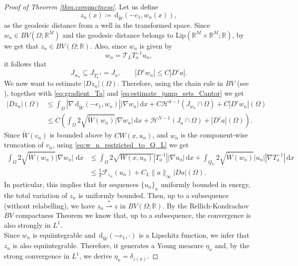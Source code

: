 \documentclass[a4paper, 11pt, reqno]{amsart}
\theoremstyle{plain}
\theoremstyle{definition}
\theoremstyle{remark}
\newcommand{\R}{\mathbb R}
\newcommand{\eps}{\varepsilon}
\renewcommand{\H}{\mathcal H}
\newcommand{\dd}{\,\mathrm{d}}
\begin{document}
\begin{proof}[Proof of Theorem \ref{thm:compactness}]
    Let us define 
    $$ z_n(x) \coloneqq \dd_{\tilde W}(-e_1, w_n(x)), $$
    as the geodesic distance from a well in the transformed space.
    Since $w_n \in BV(\Omega; \R^M)$ and the geodesic distance belongs to $\mathrm{Lip}(\R^M \times \R^M; \R)$, by \cite[Proposition 3.69(c)]{AFP} we get that $z_n \in BV(\Omega; \R)$.
    Also, since $w_n$ is given by
    $$ w_n = \mathcal{T}_L T_a^{-1} u_n, $$
    it follows that 
    \begin{equation}\label{eq:estimate_jump_sets_Cantor}
        J_{w_n} \subseteq J_{T_a^{-1}} = J_a, \qquad | D^c w_n | \leq C |D^c a|.
    \end{equation}
    We now want to estimate $| D z_n | (\Omega)$. Therefore, using the chain rule in $BV$ (see \cite[Theorem 3.101]{AFP}), together with \eqref{eq:gradient_Ta} and \eqref{eq:estimate_jump_sets_Cantor} we get
    \begin{align*}
        |D z_n|(\Omega) &\leq \int_\Omega |\nabla \dd_{\tilde W}(-e_1, w_n)||\nabla w_n| \, \mathrm{d}x + C \H^{d-1}(J_{w_n} \cap \Omega) + C |D^c w_n|(\Omega) \\
        &\leq C \left( \int_\Omega 2\sqrt{\widetilde{W} (w_n)}|\nabla w_n| \, \mathrm{d}x + \H^{N-1}(J_a \cap \Omega) + |D^c a|(\Omega) \right).
    \end{align*}
    Since $\widetilde{W}(v_n)$ is bounded above by $C W(x,u_n)$, and $w_n$ is the component-wise truncation of $v_n$, using \eqref{eq:w_n_restricted_to_Q_L} we get
    \begin{align*}
        \int_\Omega 2 \sqrt{\widetilde{W}(w_n)} |\nabla w_n| \, \dd x &\leq \int_\Omega 2 \sqrt{W(x,u_n)} |T_a^{-1}| | \nabla u_n| \, \mathrm{d} x + \int_{Q_L} 2 \sqrt{\widetilde{W}(w_n)} | u_n | | \nabla T_a^{-1}| \, \mathrm{d} x \\
        &\leq \frac{1}{\delta} \mathcal{F}_{\eps_n} (u_n) + C_L \| a \|_\infty | D a|(\Omega).
    \end{align*}
    In particular, this implies that for sequences $\{ u_n \}_n$ uniformly bounded in energy, the total variation of $z_n$ is uniformly bounded. Then, up to a subsequence (without relabelling), we have $z_n \overset{*}{\rightharpoonup} z$ in $BV(\Omega; \R)$. By the Rellich-Kondrachov $BV$ compactness Theorem we know that, up to a subsequence, the convergence is also strongly in $L^1$.\\
    
    Since $w_n$ is equiintegrable and $\dd_{\tilde W}(-e_1, \cdot)$ is a Lipschitz function, we infer that $z_n$ is also equiintegrable. Therefore, it generates a Young measure $\eta_x$ and, by the strong convergence in $L^1$, we derive $\eta_x = \delta_{z(x)}$. 
    

\end{proof}
\end{document}
